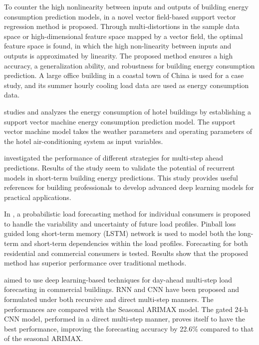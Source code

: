 To counter the high nonlinearity between inputs and outputs of building energy consumption prediction models, in \cite{ZHONG2019403} a novel vector field-based support vector regression method is proposed.
Through multi-distortions in the sample data space or high-dimensional feature space mapped by a vector field, the optimal feature space is found, in which the high non-linearity between inputs and outputs is approximated by linearity.
The proposed method ensures a high accuracy, a generalization ability, and robustness for building energy consumption prediction.
A large office building in a coastal town of China is used for a case study, and its summer hourly cooling load data are used as energy consumption data.

\cite{SHAO2020102128} studies and analyzes the energy consumption of hotel buildings by establishing a support vector machine energy consumption prediction model.
The support vector machine model takes the weather parameters and operating parameters of the hotel air-conditioning system as input variables.

\cite{FAN2019700} investigated the performance of different strategies for multi-step ahead predictions.
Results of the study seem to validate the potential of recurrent models in short-term building energy predictions.
This study provides useful references for building professionals to develop advanced deep learning models for practical applications.

In \cite{WANG201910}, a probabilistic load forecasting method for individual consumers is proposed to handle the variability and uncertainty of future load profiles.
Pinball loss guided long short-term memory (LSTM) network is used to model both the long-term and short-term dependencies within the load profiles.
Forecasting for both residential and commercial consumers is tested.
Results show that the proposed method has superior performance over traditional methods.

\cite{CAI20191078} aimed to use deep learning-based techniques for day-ahead multi-step load forecasting in commercial buildings.
RNN and CNN have been proposed and formulated under both recursive and direct multi-step manners.
The performances are compared with the Seasonal ARIMAX model.
The gated 24-h CNN model, performed in a direct multi-step manner, proves itself to have the best performance, improving the forecasting accuracy by 22.6\% compared to that of the seasonal ARIMAX.


